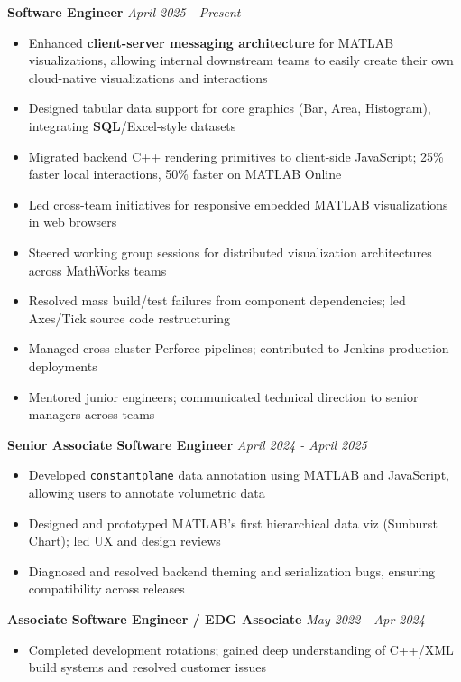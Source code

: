 \documentclass{article}
\begin{document}
{\large \textbf{Software Engineer}} \hfill \textit{April 2025 - Present}
\begin{itemize}[leftmargin=*]
    \item Enhanced \textbf{client-server messaging architecture} for MATLAB visualizations, allowing internal downstream teams to easily create their own cloud-native visualizations and interactions
    \item Designed tabular data support for core graphics (Bar, Area, Histogram), integrating \textbf{SQL}/Excel-style datasets
    \item Migrated backend C++ rendering primitives to client-side JavaScript; 25\% faster local interactions, 50\% faster on MATLAB Online
    \item Led cross-team initiatives for responsive embedded MATLAB visualizations in web browsers
    \item Steered working group sessions for distributed visualization architectures across MathWorks teams
    \item Resolved mass build/test failures from component dependencies; led Axes/Tick source code restructuring
    \item Managed cross-cluster Perforce pipelines; contributed to Jenkins production deployments
    \item Mentored junior engineers; communicated technical direction to senior managers across teams
\end{itemize}

{\large \textbf{Senior Associate Software Engineer}} \hfill \textit{April 2024 - April 2025}
\begin{itemize}[leftmargin=*]
    \item Developed \texttt{constantplane} data annotation using MATLAB and JavaScript, allowing users to annotate volumetric data
    \item Designed and prototyped MATLAB's first hierarchical data viz (Sunburst Chart); led UX and design reviews
    \item Diagnosed and resolved backend theming and serialization bugs, ensuring compatibility across releases
\end{itemize}

{\large \textbf{Associate Software Engineer / EDG Associate}} \hfill \textit{May 2022 - Apr 2024}
\begin{itemize}[leftmargin=*]
    \item Completed development rotations; gained deep understanding of C++/XML build systems and resolved customer issues
\end{itemize}
\end{document}
